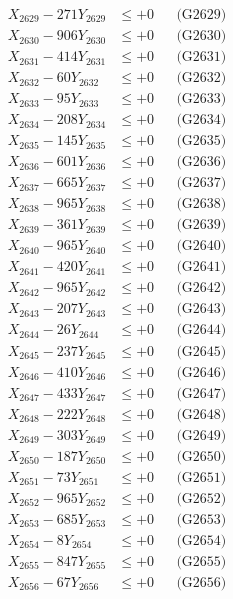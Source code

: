 \documentclass[a4paper,10pt]{article}
\begin{document}
{\begin{align}
X_{2629} - 271Y_{2629} &\leq +0 && \text{(G2629)} \\
X_{2630} - 906Y_{2630} &\leq +0 && \text{(G2630)} \\
\allowbreak
X_{2631} - 414Y_{2631} &\leq +0 && \text{(G2631)} \\
X_{2632} - 60Y_{2632} &\leq +0 && \text{(G2632)} \\
X_{2633} - 95Y_{2633} &\leq +0 && \text{(G2633)} \\
X_{2634} - 208Y_{2634} &\leq +0 && \text{(G2634)} \\
X_{2635} - 145Y_{2635} &\leq +0 && \text{(G2635)} \\
X_{2636} - 601Y_{2636} &\leq +0 && \text{(G2636)} \\
X_{2637} - 665Y_{2637} &\leq +0 && \text{(G2637)} \\
X_{2638} - 965Y_{2638} &\leq +0 && \text{(G2638)} \\
X_{2639} - 361Y_{2639} &\leq +0 && \text{(G2639)} \\
X_{2640} - 965Y_{2640} &\leq +0 && \text{(G2640)} \\
\allowbreak
X_{2641} - 420Y_{2641} &\leq +0 && \text{(G2641)} \\
X_{2642} - 965Y_{2642} &\leq +0 && \text{(G2642)} \\
X_{2643} - 207Y_{2643} &\leq +0 && \text{(G2643)} \\
X_{2644} - 26Y_{2644} &\leq +0 && \text{(G2644)} \\
X_{2645} - 237Y_{2645} &\leq +0 && \text{(G2645)} \\
X_{2646} - 410Y_{2646} &\leq +0 && \text{(G2646)} \\
X_{2647} - 433Y_{2647} &\leq +0 && \text{(G2647)} \\
X_{2648} - 222Y_{2648} &\leq +0 && \text{(G2648)} \\
X_{2649} - 303Y_{2649} &\leq +0 && \text{(G2649)} \\
X_{2650} - 187Y_{2650} &\leq +0 && \text{(G2650)} \\
\allowbreak
X_{2651} - 73Y_{2651} &\leq +0 && \text{(G2651)} \\
X_{2652} - 965Y_{2652} &\leq +0 && \text{(G2652)} \\
X_{2653} - 685Y_{2653} &\leq +0 && \text{(G2653)} \\
X_{2654} - 8Y_{2654} &\leq +0 && \text{(G2654)} \\
X_{2655} - 847Y_{2655} &\leq +0 && \text{(G2655)} \\
X_{2656} - 67Y_{2656} &\leq +0 && \text{(G2656)} \\

\end{align}}
\end{document}
